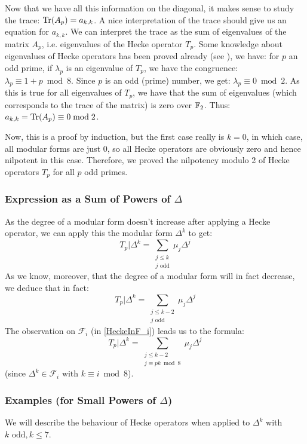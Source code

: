 Now that we have all this information on the diagonal, it makes sense to study the trace: 
$\text{Tr}(A_p) = a_{k,k}$.
A nice interpretation of the trace should give us an equation for $a_{k,k}$.
We can interpret the trace as the sum of eigenvalues of the matrix $A_p$, i.e. eigenvalues of the Hecke operator $T_p$.
Some knowledge about eigenvalues of Hecke operators has been proved already (see \cite{EigenvaluesOfHeckeOperators}), we have:
for $p$ an odd prime, if $\lambda_p$ is an eigenvalue of $T_p$, we have the congruence: $\lambda_p \equiv 1+p \bmod 8$.
Since $p$ is an odd (prime) number, we get: $\lambda_p \equiv 0 \bmod 2$.
As this is true for all eigenvalues of $T_p$, we have that the sum of eigenvalues (which corresponds to the trace of the matrix) is zero over $\mathbb{F}_2$.
Thus: 
$a_{k,k} = \text{Tr}(A_p) \equiv 0 \bmod 2$.

Now, this is a proof by induction, but the first case really is $k=0$, in which case, all modular forms are just $0$, so all Hecke operators are obviously zero and hence nilpotent in this case.
Therefore, we proved the nilpotency modulo 2 of Hecke operators $T_p$ for all $p$ odd primes.

\subsubsection[Expression for $T_p|\Delta^k$]{Expression as a Sum of Powers of $\Delta$}
As the degree of a modular form doesn't increase after applying a Hecke operator, we can apply this the modular form $\Delta^k$ to get:
$$
T_p|\Delta^k = \sum_{\substack{j \leq k \\ j \text{ odd}}} \mu_j\Delta^j
$$
As we know, moreover, that the degree of a modular form will in fact decrease, we deduce that in fact:
\[
T_p|\Delta^k = \sum_{\substack{j \leq k-2\\ j \text{ odd}}} \mu_j\Delta^j
\label{eq:TpDelta^k} \tag{*}
\]
The observation on $\mathcal{F}_i$ (in \ref{HeckeInF_i}) leads us to the formula:
\[
T_p|\Delta^k = \sum_{\substack{j \leq k-2\\ j \equiv pk \bmod 8}} \mu_j\Delta^j
\label{eq:TpDelta^k_bis} \tag{**}
\]
(since $\Delta^k \in \mathcal{F}_i \text{ with } k \equiv i \bmod 8$).

\subsubsection{Examples (for Small Powers of $\Delta$)}
\label{examplesSmallPowersDelta}
We will describe the behaviour of Hecke operators when applied to $\Delta^k$ with $k \text{ odd}, k \leq 7$.

